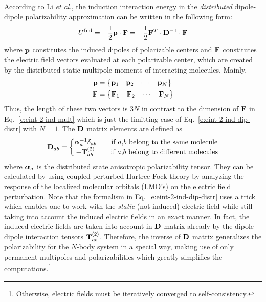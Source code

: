 \documentclass[a4paper,titlepage,twoside,fleqn,12pt]{book}
\newcommand{\BM}[1]{\ensuremath{\mbox{\boldmath${#1}$}}}
\begin{document}
\begin{refsection}
According to Li \emph{et al.},\citep{Li.Netzloff.Gordon.JCP.2006} 
the induction interaction energy in the 
\emph{distributed} dipole\hyp{}dipole polarizability approximation 
can be written in the following form:
%
\begin{equation} \label{e:eint-2-ind-dip-distr}
U^{\rm Ind} = - \frac{1}{2} {\bf p} \cdot {\bf F} = - \frac{1}{2} {\bf F}^T \cdot {\bf D}^{-1} \cdot {\bf F}
\end{equation}
%
where ${\bf p}$ constitutes the induced dipoles of 
polarizable centers and ${\bf F}$ constitutes the electric field 
vectors evaluated at each polarizable center, which are created by the 
distributed static multipole moments of interacting molecules.
Mainly,
%
\begin{subequations} \label{e:pf}
\begin{align}
 {\bf p} &= 
 \begin{Bmatrix}
  {\bf p}_1 & {\bf p}_2 & \cdots & {\bf p}_N
 \end{Bmatrix} \\
 {\bf F}&= 
 \begin{Bmatrix}
  {\bf F}_1 & {\bf F}_2 & \cdots & {\bf F}_N
 \end{Bmatrix}
\end{align}
\end{subequations}
%
Thus, the length of these two vectors is $3N$ in contrast to the dimension
of $\bf F$ in Eq.~\eqref{e:eint-2-ind-mult} which is just the limitting case of 
Eq.~\eqref{e:eint-2-ind-dip-distr} with $N=1$.
The $\bf D$ matrix elements are defined as
%
\begin{equation} \label{e:D-matrix}
{\bf D}_{ab} = 
\left\{\begin{matrix}               
{\BM \alpha}_a^{-1} \delta_{ab} && \text{if $a$,$b$ belong to the same molecule} \\
-{\bf T}_{ab}^{(2)}             && \text{if $a$,$b$ belong to different molecules}
\end{matrix}\right. 
\end{equation}
%
where ${\BM \alpha}_a$ is the distributed state anisotropic polarizability
tensor. They can be calculated by using coupled\hyp{}perturbed Hartree\hyp{}Fock
theory by analyzing the response of the localized molecular orbitals
(LMO's) on the electric field perturbation. Note that the formalism
in Eq.~\eqref{e:eint-2-ind-dip-distr} uses a trick which enables one
to work with the \emph{static} (not induced) electric field while still taking
into account the induced electric fields in an exact manner. In fact,
the induced electric fields are taken into account in $\bf D$ matrix already
by the dipole\hyp{}dipole interaction tensors ${\bf T}_{ab}^{(2)}$.
Therefore, the inverse of $\bf D$ matrix generalizes
the polarizability for the $N$-body system in a special way, making use
of only permanent multipoles and polarizabilities which greatly simplifies
the computations.\footnote{Otherwise, electric fields must be iteratively converged to
self\hyp{}consistency.}


\end{refsection}
\end{document}
